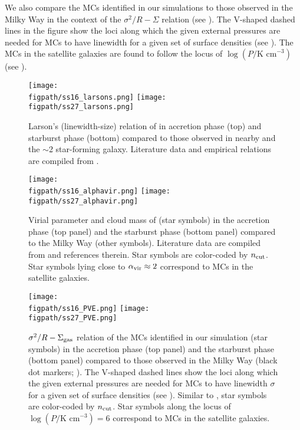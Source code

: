 \IfFileExists{emulateapjlegacy.cls}{\documentclass[iop]{emulateapjlegacy}}{\documentclass[iop]{emulateapj}}
\begin{document}
We also compare the MCs identified in our simulations to
those observed in the Milky Way in the context of the $\sigma^2/R - \Sigma$ relation (see ). 
The V-shaped dashed lines in the figure show the loci along which the given external pressures are needed for
MCs to have linewidth for a given set of surface densities (see ).
The MCs in the satellite galaxies are found to follow the locus of $\log{(P/\textrm{K cm}^{-3})}$ (see ).


\begin{figure*}[htbp]
\centering
\texttt{[image: \\figpath/ss16\_larsons.png]}
\texttt{[image: \\figpath/ss27\_larsons.png]}
\caption{
Larson's (linewidth-size) relation of \flower in
accretion phase (top) and
starburst phase (bottom) compared to
those observed in nearby and the \z$\sim$2 star-forming galaxy.
Literature data and empirical relations are compiled from \citet{Larson81a, Heyer04a, Rosolowsky05a, Bolatto08a, Swinbank11a, Leroy15a}.
\label{fig:larsons_single}}
\end{figure*}


\begin{figure*}[htbp]
\centering
\texttt{[image: \\figpath/ss16\_alphavir.png]}
\texttt{[image: \\figpath/ss27\_alphavir.png]}
\caption{
Virial parameter and cloud mass of \flower (star symbols) in the accretion phase (top panel) 
and the starburst phase (bottom panel) compared to the 
Milky Way (other symbols).
Literature data are compiled from \citealt{Kauffmann17b} and references therein.
Star symbols are color-coded by $n_{\rm cut}$.
Star symbols lying close to $\alpha_{\rm vir}\approx2$ correspond to MCs in the satellite galaxies.
\label{fig:alpha16}}
\end{figure*}


\begin{figure*}[htbp]
\centering
\texttt{[image: \\figpath/ss16\_PVE.png]}
\texttt{[image: \\figpath/ss27\_PVE.png]}
\caption{
$\sigma^2/R - \Sigma_{\rm gas}$ relation of the MCs identified in our simulation (star symbols)
in the accretion phase (top panel) and the starburst phase (bottom panel)
compared to those observed in the Milky Way (black dot markers; \citealt{Heyer09a}).
The V-shaped dashed lines show the loci along which the given external pressures
are needed for MCs to have linewidth $\sigma$ for a given set of surface densities (see ).
Similar to , star symbols are color-coded by $n_{\rm cut}$.
Star symbols along the locus of $\log{(P/\textrm{K cm}^{-3}) = 6}$
correspond to MCs in the satellite galaxies.
\label{fig:alpha27}}
\end{figure*}
\end{document}
